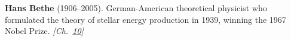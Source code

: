 \nobelphysics \textbf{Hans Bethe} (1906–2005). German-American theoretical physicist who formulated the theory of stellar energy production in 1939, winning the 1967 Nobel Prize. \emph{[Ch.~\hyperref[ch:solarfusionquantumtunneling]{10}]}

